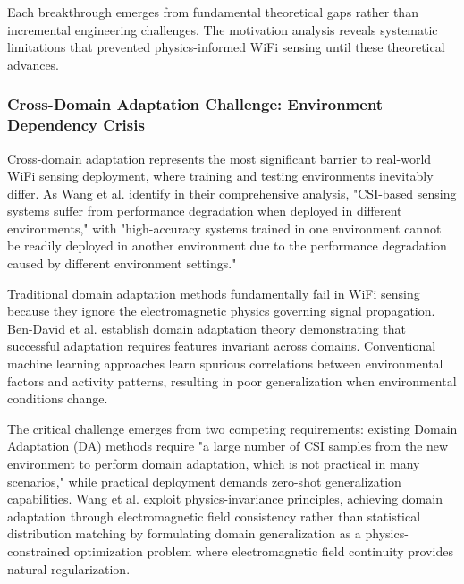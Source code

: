 \documentclass[journal]{IEEEtran}
\begin{document}
Each breakthrough emerges from fundamental theoretical gaps rather than incremental engineering challenges. The motivation analysis reveals systematic limitations that prevented physics-informed WiFi sensing until these theoretical advances.

\subsubsection{Cross-Domain Adaptation Challenge: Environment Dependency Crisis}

Cross-domain adaptation represents the most significant barrier to real-world WiFi sensing deployment, where training and testing environments inevitably differ. As Wang et al. \cite{wang2022airfi} identify in their comprehensive analysis, "CSI-based sensing systems suffer from performance degradation when deployed in different environments," with "high-accuracy systems trained in one environment cannot be readily deployed in another environment due to the performance degradation caused by different environment settings."

Traditional domain adaptation methods fundamentally fail in WiFi sensing because they ignore the electromagnetic physics governing signal propagation. Ben-David et al. \cite{ben2010theory} establish domain adaptation theory demonstrating that successful adaptation requires features invariant across domains. Conventional machine learning approaches learn spurious correlations between environmental factors and activity patterns, resulting in poor generalization when environmental conditions change.

The critical challenge emerges from two competing requirements: existing Domain Adaptation (DA) methods require "a large number of CSI samples from the new environment to perform domain adaptation, which is not practical in many scenarios," while practical deployment demands zero-shot generalization capabilities. Wang et al. exploit physics-invariance principles, achieving domain adaptation through electromagnetic field consistency rather than statistical distribution matching by formulating domain generalization as a physics-constrained optimization problem where electromagnetic field continuity provides natural regularization.
\end{document}
